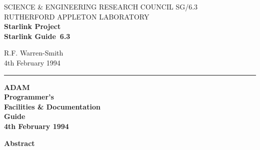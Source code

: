 \documentclass[twoside,11pt]{article}
\newcommand{\stardoccategory}  {Starlink Guide}
\newcommand{\stardocinitials}  {SG}
\newcommand{\stardocnumber}    {6.3}
\newcommand{\stardocauthors}   {R.F. Warren-Smith}
\newcommand{\stardocdate}      {4th February 1994}
\newcommand{\stardoctitle}     {ADAM\\[0.75ex]
                                Programmer's\\
                                Facilities \& Documentation\\
                                Guide}
\newcommand{\stardocname}{\stardocinitials /\stardocnumber}
\newenvironment{latexonly}{}{}
\begin{document}
\thispagestyle{empty}


\begin{latexonly}
   SCIENCE \& ENGINEERING RESEARCH COUNCIL \hfill \stardocname\\
   RUTHERFORD APPLETON LABORATORY\\
   {\large\bf Starlink Project\\}
   {\large\bf \stardoccategory\ \stardocnumber}
   \begin{flushright}
   \stardocauthors\\
   \stardocdate
   \end{flushright}
   \vspace{-4mm}
   \rule{\textwidth}{0.5mm}
   \vspace{5mm}
   \begin{center}
   {\Huge\bf  \stardoctitle \\ [3.5ex]}
   {\Large \bf  \stardocdate}
   \end{center}
   \vspace{20mm}

   \vspace{10mm}
   \begin{center}
      {\Large\bf Abstract}
   \end{center}
\end{latexonly}
\end{document}
